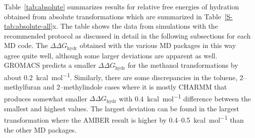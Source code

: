 \documentclass[journal=jctcce,manuscript=article]{achemso}
\begin{document}
Table~\ref{tab:absolute} summarizes results for relative free energies of 
hydration obtained from absolute transformations which are summarized in Table~\ref{S-tab:absolute-all}x.  The table shows the data 
from simulations with the recommended protocol as discussed in detail in the 
following subsections for each MD code. The $\Delta\Delta G_{\mathrm{hydr}}$ 
obtained with the various MD packages in 
this way agree quite well, although some larger deviations are apparent as 
well.  GROMACS predicts a smaller $\Delta\Delta G_{\mathrm{hydr}}$ for the 
methanol transformations by about \SI{0.2}{kcal.mol^{-1}}.  Similarly, there 
are some discrepancies in the toluene, 2--methylfuran and 2--methylindole cases 
where it is mostly CHARMM that produces somewhat smaller $\Delta\Delta 
G_{\mathrm{hydr}}$ with \SI{0.4}{kcal.mol^{-1}} difference between the 
smallest and highest values.  The largest deviation can be found in the largest 
transformation where the AMBER result is higher by 0.4--\SI{0.5}{kcal.mol^{-1}} 
than the other MD packages.
\begin{table}[]
  \begin{minipage}{\linewidth}
    \caption{Comparing relative free energies of hydration for various MD 
    packages as obtained from absolute transformations.}\label{tab:absolute}
  \end{minipage}
\end{table}
\end{document}
